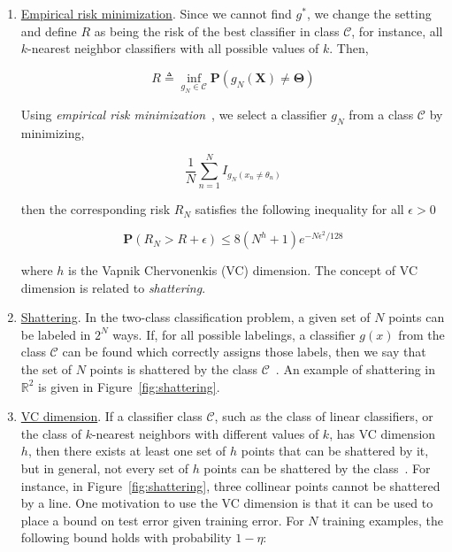\begin{enumerate}
\item \underline{Empirical risk minimization}.
Since we cannot find $g^*$, we change the setting and define $R$ as being the risk of the best classifier in class $\mathcal{C}$, for instance, all $k$-nearest neighbor classifiers with all possible values of $k$.  Then,

\begin{equation}
R \triangleq \inf\limits_{g_N \in \mathcal{C}} \mathbf{P}(g_N(\mathbf{X}) \neq \mathbf{\Theta})
\end{equation}

Using \emph{empirical risk minimization}~\cite{1999_BOOK_PRML_Vapnik}, we select a classifier $g_N$ from a class $\mathcal{C}$ by minimizing, 

\begin{equation}
\frac{1}{N} \sum\limits_{n=1}^N I_{g_N(x_n \neq \theta_n)}
\end{equation}

then the corresponding risk $R_N$ satisfies the following inequality for all $\epsilon > 0$

\begin{equation}
\mathbf{P}(R_N > R + \epsilon) \leq 8(N^h + 1) e^{-N\epsilon^2/128}
\end{equation}

where $h$ is the Vapnik Chervonenkis (VC) dimension.  The concept of VC dimension is related to \emph{shattering}.

\item \underline{Shattering}.  In the two-class classification problem, a given set of $N$ points can be labeled in $2^N$ ways.  If, for all possible labelings, a classifier $g(x)$ from the class $\mathcal{C}$ can be found which correctly assigns those labels, then we say that the set of $N$ points is shattered by the class $\mathcal{C}$~\cite{1998_JNL_SVM_Burges}.  An example of shattering in $\mathbb{R}^2$ is given in Figure~\ref{fig:shattering}.

\item \underline{VC dimension}.  If a classifier class $\mathcal{C}$, such as the class of linear classifiers, or the class of $k$-nearest neighbors with different values of $k$, has VC dimension $h$, then there exists at least one set of $h$ points that can be shattered by it, but in general, not every set of $h$ points can be shattered by the class~\cite{1998_JNL_SVM_Burges}.  For instance, in Figure~\ref{fig:shattering}, three collinear points cannot be shattered by a line.  One motivation to use the VC dimension is that it can be used to place a bound on test error given training error.  For $N$ training examples, the following bound holds with probability $1-\eta$\cite{1999_BOOK_PRML_Vapnik}:


\end{enumerate}
